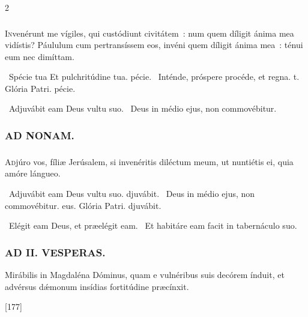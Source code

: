\documentclass[9pt,twoside]{extarticle}
\begin{document}
\begin{multicols}{2}
{{\subsubsection*{}
\lettrine{I}nvenérunt me vígiles, qui custódiunt civitátem~: num quem díligit ánima mea vidístis? Páululum cum pertransíssem eos, invéni quem díligit ánima mea~: ténui eum nec dimíttam.

\begin{tightlist}{}
\item {}~Spécie tua \textred{*} Et pulchritúdine tua. pécie. ~Inténde, próspere procéde, et regna. t. Glória Patri. pécie.
\item {}~Adjuvábit eam Deus vultu suo. ~Deus in médio ejus, non commovébitur.
\end{tightlist}

\subsubsection*{\center \textsc{AD NONAM.}}
\subsubsection*{}
\lettrine{A}djúro vos, fíliæ Jerúsalem, si invenéritis diléctum meum, ut nuntiétis ei, quia amóre lángueo.

\begin{tightlist}{}
\item {}~Adjuvábit eam \textred{*} Deus vultu suo. djuvábit. ~Deus in médio ejus, non commovébitur. eus. Glória Patri. djuvábit.
\item {}~Elégit eam Deus, et præelégit eam. ~Et habitáre eam facit in tabernáculo suo.
\end{tightlist}

\subsubsection*{\center \textsc{AD II. VESPERAS.}}
\begin{tightlist}{}
\item {} Mirábilis in Magdaléna Dóminus, quam e vulnéribus suis decórem índuit, et advérsus dǽmonum insídias fortitúdine præcínxit.
\item {} [177]
\end{tightlist}

}}
\end{multicols}
\end{document}
